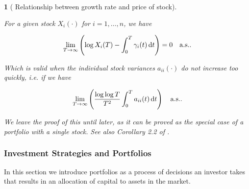 \documentclass[british]{amsart} \usepackage{lmodern}
\numberwithin{equation}{section} \numberwithin{figure}{section}
\theoremstyle{plain} \newtheorem{thm}{\protect\theoremname}[section]
\theoremstyle{definition} \newtheorem{defn}[thm]{\protect\definitionname}
\theoremstyle{plain} \newtheorem{assumption}[thm]{\protect\assumptionname}
\theoremstyle{plain} \newtheorem{lem}[thm]{\protect\lemmaname}
\theoremstyle{plain} \newtheorem{prop}[thm]{\protect\propositionname}
\theoremstyle{remark} \newtheorem{rem}[thm]{\protect\remarkname}
\theoremstyle{plain} \newtheorem{cor}[thm]{\protect\corollaryname}
\renewcommand{\d}[1]{\mathop{\mathrm{d}{#1}}}
\newcommand{\rangei}{i=1,\dots,n} \newcommand{\measure}{\mathbb{P}}
\begin{document}
\begin{lem} [{\cite[Equation 1.6]{fernholz2009}} Relationship between growth
rate and price of stock]
  \label{lem:stockgrowthrate}

  For a given stock $X_{i}(\cdot)$ for $\rangei$, we have

  \begin{equation}
    \lim_{T \to \infty} 
      \left( 
      \log{X_{i}(T)} - \int_{0}^{T} \gamma_{i}(t)\d{t} 
      \right) = 0
    \quad \almostsurely.
  \end{equation}

  Which is valid when the individual stock variances $a_{ii}(\cdot)$ do not
  increase too quickly, i.e. if we have 

  \begin{equation*}
    \lim_{T\to\infty} \left( \frac{\log \log T}{T^2} \int_{0}^{T} a_{ii}(t) \d{t} \right)
    \quad \almostsurely.
  \end{equation*}

  We leave the proof of this until later, as it can be proved as the special case
  of a portfolio with a single stock. See also Corollary 2.2 of \cite{fernholz1999pgf}.

\end{lem}

\newpage
\subsubsection{Investment Strategies and Portfolios}

In this section we introduce portfolios as a process of decisions an investor
takes that results in an allocation of capital to assets in the market.
\end{document}
